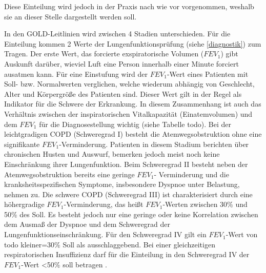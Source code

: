 Diese Einteilung wird jedoch in der Praxis nach wie vor vorgenommen, weshalb sie an dieser Stelle dargestellt werden soll.

In den GOLD-Leitlinien wird zwischen 4 Stadien unterschieden. Für die Einteilung kommen 2 Werte der Lungenfunktionsprüfung (siehe \ref{diagnostik}) zum Tragen. Der erste Wert, das forcierte exspiratorische Volumen ($FEV_{1}$) gibt Auskunft darüber, wieviel Luft eine Person innerhalb einer Minute forciert ausatmen kann. Für eine Einstufung wird der $FEV_{1}$-Wert eines Patienten mit Soll- bzw. Normalwerten verglichen, welche wiederum abhängig von Geschlecht, Alter und Körpergröße des Patienten sind. Dieser Wert gilt in der Regel als Indikator für die Schwere der Erkrankung. In diesem Zusammenhang ist auch das Verhältnis zwischen der inspiratorischen Vitalkapazität (Einatemvolumen) und dem $FEV_{1}$ für die Diagnosestellung wichtig (siehe Tabelle todo). Bei der leichtgradigen COPD (Schweregrad I) besteht die Atemwegsobstruktion ohne eine signifikante $FEV_{1}$-Verminderung. Patienten in diesem Stadium berichten über chronischen Husten und Auswurf, bemerken jedoch meist noch keine Einschränkung ihrer Lungenfunktion. Beim Schweregrad II besteht neben der Atemwegsobstruktion bereits eine geringe $FEV_{1}$- Verminderung und die kranksheitsspezifischen Symptome, insbesondere Dyspnoe unter Belastung, nehmen zu. Die schwere COPD (Schweregrad III) ist charakterisiert durch eine höhergradige $FEV_{1}$-Verminderung, das heißt $FEV_{1}$-Werten zwischen 30\% und 50\% des Soll. Es besteht jedoch nur eine geringe oder keine Korrelation zwischen dem Ausmaß der Dyspnoe und dem Schweregrad der Lungenfunktionseinschränkung. Für den Schweregrad IV gilt ein $FEV_{1}$-Wert von todo kleiner=30\% Soll als ausschlaggebend. Bei einer gleichzeitigen respiratorischen Insuffizienz darf für die Einteilung in den Schweregrad IV der $FEV_{1}$-Wert <50\% soll betragen \autocite[vgl.][e8]{vogelmeier2007}.

